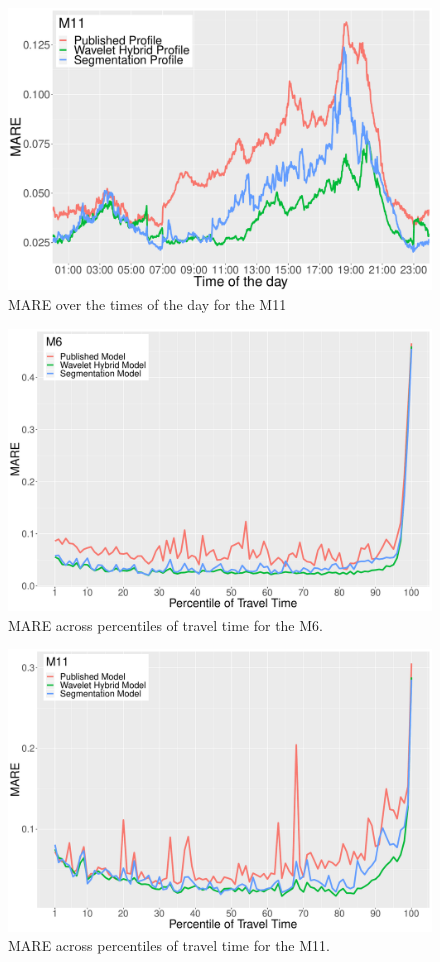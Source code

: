\documentclass[a4paper, 10pt, conference]{ieeeconf}      %
\begin{document}
\begin{figure}[htbp]
	\centerline{\includegraphics[width=\linewidth]{./images/M11_daytime_8_12.pdf}}
	\caption{MARE over the times of the day for the M11}
	\label{fig:m11dt}
\end{figure}
\begin{figure}[htbp]
	\centerline{\includegraphics[width=\linewidth]{./images/M6_quantile_1_ab_8_12.pdf}}
	\caption{MARE across percentiles of travel time for the M6.}
	\label{fig:m6q}
\end{figure}
\begin{figure}[htbp]
	\centerline{\includegraphics[width=\linewidth]{./images/M11_quantile_1_ab_8_12.pdf}}
	\caption{MARE across percentiles of travel time for the M11.}
	\label{fig:m11q}
\end{figure}
\end{document}
